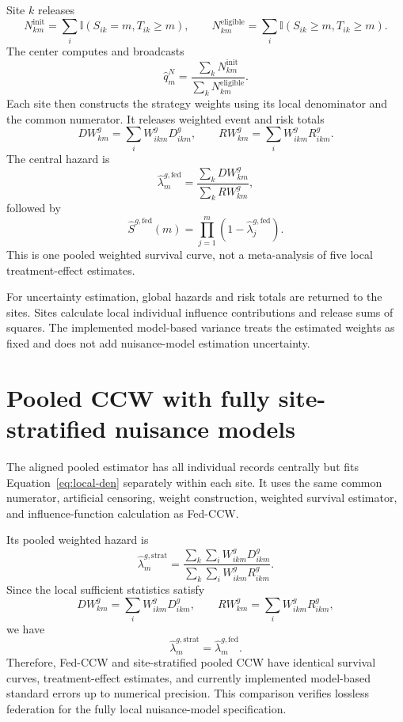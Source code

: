 \documentclass[11pt]{article}
\newcommand{\ind}{\mathbb{I}}
\begin{document}
Site $k$ releases
\[
  N^{\mathrm{init}}_{km}
  =\sum_i\ind(S_{ik}=m,T_{ik}\geq m),
  \qquad
  N^{\mathrm{eligible}}_{km}
  =\sum_i\ind(S_{ik}\geq m,T_{ik}\geq m).
\]
The center computes and broadcasts
\begin{equation}
\label{eq:fed-num}
  \widehat q_m^N
  =\frac{\sum_kN^{\mathrm{init}}_{km}}
         {\sum_kN^{\mathrm{eligible}}_{km}}.
\end{equation}
Each site then constructs the strategy weights using its local denominator and
the common numerator. It releases weighted event and risk totals
\[
  DW^g_{km}=\sum_iW^g_{ikm}D^g_{ikm},
  \qquad
  RW^g_{km}=\sum_iW^g_{ikm}R^g_{ikm}.
\]
The central hazard is
\begin{equation}
\label{eq:fed-hazard}
  \widehat\lambda_m^{g,\mathrm{fed}}
  =\frac{\sum_kDW^g_{km}}{\sum_kRW^g_{km}},
\end{equation}
followed by
\[
  \widehat S^{g,\mathrm{fed}}(m)
  =\prod_{j=1}^m(1-\widehat\lambda_j^{g,\mathrm{fed}}).
\]
This is one pooled weighted survival curve, not a meta-analysis of five local
treatment-effect estimates.

For uncertainty estimation, global hazards and risk totals are returned to
the sites. Sites calculate local individual influence contributions and
release sums of squares. The implemented model-based variance treats the
estimated weights as fixed and does not add nuisance-model estimation
uncertainty.

\section{Pooled CCW with fully site-stratified nuisance models}

The aligned pooled estimator has all individual records centrally but fits
Equation~\eqref{eq:local-den} separately within each site. It uses the same
common numerator, artificial censoring, weight construction, weighted survival
estimator, and influence-function calculation as Fed-CCW.

Its pooled weighted hazard is
\[
  \widehat\lambda_m^{g,\mathrm{strat}}
  =\frac{\sum_k\sum_iW^g_{ikm}D^g_{ikm}}
         {\sum_k\sum_iW^g_{ikm}R^g_{ikm}}.
\]
Since the local sufficient statistics satisfy
\[
  DW^g_{km}=\sum_iW^g_{ikm}D^g_{ikm},
  \qquad
  RW^g_{km}=\sum_iW^g_{ikm}R^g_{ikm},
\]
we have
\[
  \widehat\lambda_m^{g,\mathrm{strat}}
  =\widehat\lambda_m^{g,\mathrm{fed}}.
\]
Therefore, Fed-CCW and site-stratified pooled CCW have identical survival
curves, treatment-effect estimates, and currently implemented model-based
standard errors up to numerical precision. This comparison verifies lossless
federation for the fully local nuisance-model specification.
\end{document}
